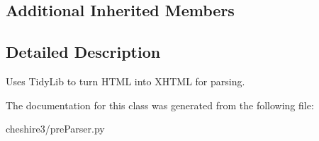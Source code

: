 \subsection*{Additional Inherited Members}


\subsection{Detailed Description}
\begin{DoxyVerb}Uses TidyLib to turn HTML into XHTML for parsing.\end{DoxyVerb}
 

The documentation for this class was generated from the following file\-:\begin{DoxyCompactItemize}
\item 
cheshire3/pre\-Parser.\-py\end{DoxyCompactItemize}
